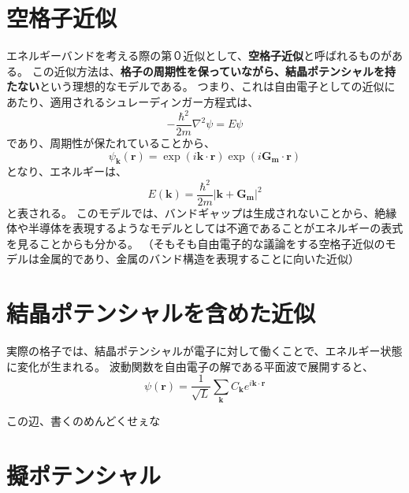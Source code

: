 \documentclass[a4paper]{jsreport}
\begin{document}
        \section{空格子近似}
            エネルギーバンドを考える際の第０近似として、\textbf{空格子近似}と呼ばれるものがある。
            この近似方法は、\textbf{格子の周期性を保っていながら、結晶ポテンシャルを持たない}という理想的なモデルである。
            つまり、これは自由電子としての近似にあたり、適用されるシュレーディンガー方程式は、
            \begin{equation}
                -\frac{\hbar^2}{2m} \nabla^2 \psi = E \psi
            \end{equation}
            であり、周期性が保たれていることから、
            \begin{equation}
                \psi_{\boldsymbol{k}}(\boldsymbol{r}) = \exp(i\boldsymbol{k} \cdot \boldsymbol{r}) \exp(i\boldsymbol{G_m} \cdot \boldsymbol{r})
            \end{equation}
            となり、エネルギーは、
            \begin{equation}
                E(\boldsymbol{k}) = \frac{\hbar^2}{2m} \left|\boldsymbol{k} + \boldsymbol{G_m} \right| ^2
            \end{equation}
            と表される。
            このモデルでは、バンドギャップは生成されないことから、絶縁体や半導体を表現するようなモデルとしては不適であることがエネルギーの表式を見ることからも分かる。
            （そもそも自由電子的な議論をする空格子近似のモデルは金属的であり、金属のバンド構造を表現することに向いた近似）

        \section{結晶ポテンシャルを含めた近似}
            実際の格子では、結晶ポテンシャルが電子に対して働くことで、エネルギー状態に変化が生まれる。
            波動関数を自由電子の解である平面波で展開すると、
            \begin{equation}
                \psi(\boldsymbol{r}) = \frac{1}{\sqrt{L}} \sum_{\boldsymbol{k}} C_{\boldsymbol{k}} e^{i\boldsymbol{k} \cdot \boldsymbol{r}}
            \end{equation}

            この辺、書くのめんどくせぇな

        \section{擬ポテンシャル}
\end{document}

